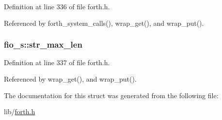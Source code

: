Definition at line 336 of file forth.\-h.



Referenced by forth\-\_\-system\-\_\-calls(), wrap\-\_\-get(), and wrap\-\_\-put().

\hypertarget{structfio__s_ad6ec0b91021e511e2e9df2c068858c74}{
\subsubsection[{str\-\_\-max\-\_\-len}]{ fio\-\_\-s\-::str\-\_\-max\-\_\-len}}\label{structfio__s_ad6ec0b91021e511e2e9df2c068858c74}


Definition at line 337 of file forth.\-h.



Referenced by wrap\-\_\-get(), and wrap\-\_\-put().



The documentation for this struct was generated from the following file\-:\begin{DoxyCompactItemize}
\item 
lib/\hyperlink{forth_8h}{forth.\-h}\end{DoxyCompactItemize}
